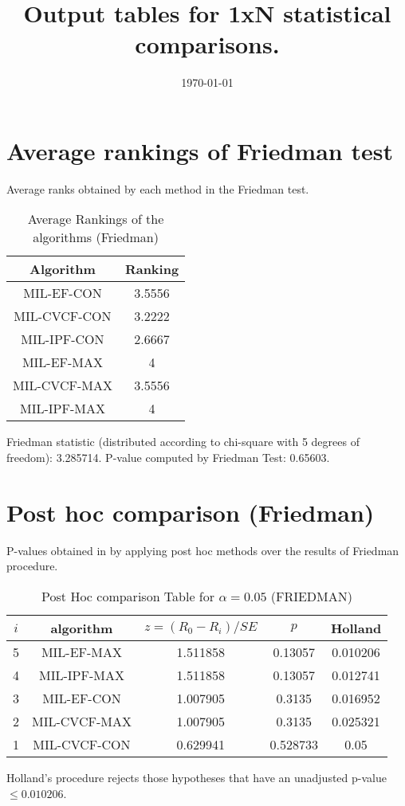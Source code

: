 \documentclass[a4paper,10pt]{article}
\title{Output tables for 1xN statistical comparisons.}
\author{}
\date{\today}
\begin{document}
\begin{landscape}
\pagestyle{empty}
\maketitle
\thispagestyle{empty}

\section{Average rankings of Friedman test}


Average ranks obtained by each method in the Friedman test.

\begin{table}[!htp]
\centering
\begin{tabular}{|c|c|}\hline
Algorithm&Ranking\\\hline
MIL-EF-CON&3.5556\\MIL-CVCF-CON&3.2222\\MIL-IPF-CON&2.6667\\MIL-EF-MAX&4\\MIL-CVCF-MAX&3.5556\\MIL-IPF-MAX&4\\\hline\end{tabular}
\caption{Average Rankings of the algorithms (Friedman)}
\end{table}

Friedman statistic (distributed according to chi-square with 5 degrees of freedom): 3.285714. \newline P-value computed by Friedman Test: 0.65603.\newline


\newpage

\section{Post hoc comparison (Friedman)}


P-values obtained in by applying post hoc methods over the results of Friedman procedure.

\begin{table}[!htp]
\centering\footnotesize
\begin{tabular}{ccccc}
$i$&algorithm&$z=(R_0 - R_i)/SE$&$p$&Holland\\
\hline5&MIL-EF-MAX&1.511858&0.13057&0.010206\\4&MIL-IPF-MAX&1.511858&0.13057&0.012741\\3&MIL-EF-CON&1.007905&0.3135&0.016952\\2&MIL-CVCF-MAX&1.007905&0.3135&0.025321\\1&MIL-CVCF-CON&0.629941&0.528733&0.05\\\hline
\end{tabular}
\caption{Post Hoc comparison Table for $\alpha=0.05$ (FRIEDMAN)}
\end{table}Holland's procedure rejects those hypotheses that have an unadjusted p-value $\le0.010206$.



\end{landscape}
\end{document}
